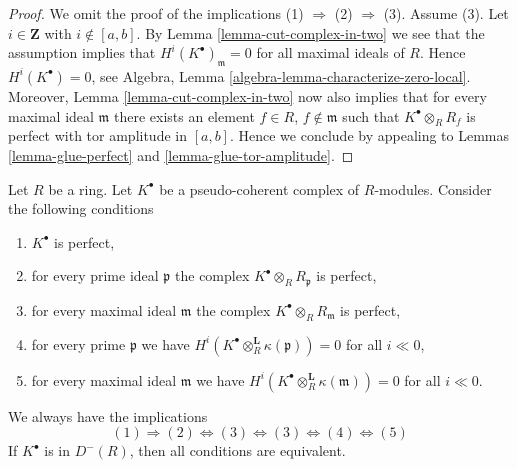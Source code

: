 \begin{proof}
We omit the proof of the implications (1) $\Rightarrow$ (2) $\Rightarrow$ (3).
Assume (3). Let $i \in \mathbf{Z}$ with $i \not \in [a, b]$. By
Lemma \ref{lemma-cut-complex-in-two}
we see that the assumption implies that $H^i(K^\bullet)_{\mathfrak m} = 0$
for all maximal ideals of $R$. Hence $H^i(K^\bullet) = 0$, see
Algebra, Lemma \ref{algebra-lemma-characterize-zero-local}.
Moreover,
Lemma \ref{lemma-cut-complex-in-two}
now also implies that for every maximal ideal
$\mathfrak m$ there exists an element $f \in R$, $f \not \in \mathfrak m$
such that $K^\bullet \otimes_R R_f$ is perfect with tor amplitude in
$[a, b]$. Hence we conclude by appealing to
Lemmas \ref{lemma-glue-perfect} and \ref{lemma-glue-tor-amplitude}.
\end{proof}

\begin{lemma}
\label{lemma-check-perfect-stalks}
Let $R$ be a ring. Let $K^\bullet$ be a pseudo-coherent
complex of $R$-modules. Consider the following conditions
\begin{enumerate}
\item $K^\bullet$ is perfect,
\item for every prime ideal $\mathfrak p$ the complex
$K^\bullet \otimes_R R_{\mathfrak p}$ is perfect,
\item for every maximal ideal $\mathfrak m$ the complex
$K^\bullet \otimes_R R_{\mathfrak m}$ is perfect,
\item for every prime $\mathfrak p$ we have
$H^i(K^\bullet \otimes_R^{\mathbf{L}} \kappa(\mathfrak p)) = 0$ for all
$i \ll 0$,
\item for every maximal ideal $\mathfrak m$ we have
$H^i(K^\bullet \otimes_R^{\mathbf{L}} \kappa(\mathfrak m)) = 0$ for all
$i \ll 0$.
\end{enumerate}
We always have the implications
$$
(1) \Rightarrow (2) \Leftrightarrow (3) \Leftrightarrow (3)
\Leftrightarrow (4) \Leftrightarrow (5)
$$
If $K^\bullet$ is in $D^{-}(R)$, then all conditions are equivalent.
\end{lemma}

